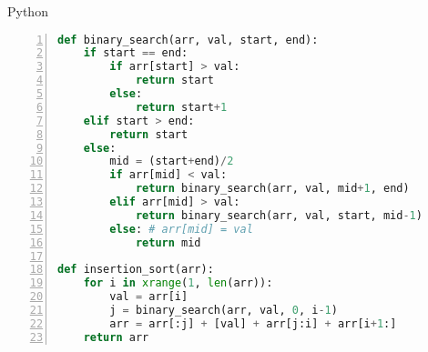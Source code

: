 \documentclass{article}
\begin{document}

\begin{programkod}
\caption{Python}
\label{prog:python}
\begin{lstlisting}[language=python,tabsize=4,numbers=left,stepnumber=1,
frame=lrTB]
def binary_search(arr, val, start, end):
	if start == end:
		if arr[start] > val:
			return start
		else:
			return start+1
	elif start > end:
		return start
	else: 
		mid = (start+end)/2
		if arr[mid] < val:
			return binary_search(arr, val, mid+1, end)
		elif arr[mid] > val:
			return binary_search(arr, val, start, mid-1)
		else: # arr[mid] = val
			return mid
			
def insertion_sort(arr):
    for i in xrange(1, len(arr)):
        val = arr[i]
        j = binary_search(arr, val, 0, i-1)
        arr = arr[:j] + [val] + arr[j:i] + arr[i+1:]
    return arr
\end{lstlisting}
\end{programkod}
\end{document}

